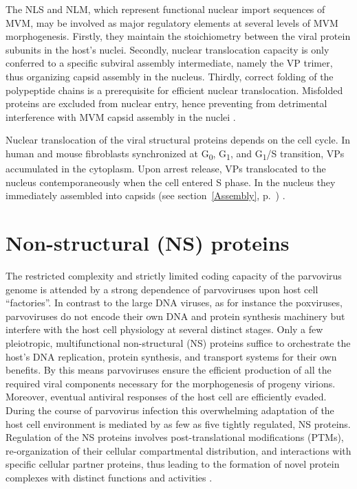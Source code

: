 The NLS and NLM, which represent functional nuclear import sequences of MVM, may be involved as major regulatory elements at several levels of MVM morphogenesis. Firstly, they maintain the stoichiometry between the viral protein subunits in the host's nuclei. Secondly, nuclear translocation capacity is only conferred to a specific subviral assembly intermediate, namely the VP trimer, thus organizing capsid assembly in the nucleus. Thirdly, correct folding of the polypeptide chains is a prerequisite for efficient nuclear translocation. Misfolded proteins are excluded from nuclear entry, hence preventing from detrimental interference with MVM capsid assembly in the nuclei \cite{pmid10729155}.

Nuclear translocation of the viral structural proteins depends on the cell cycle. In human and mouse fibroblasts synchronized at G\textsubscript{0}, G\textsubscript{1}, and G\textsubscript{1}/S transition, VPs accumulated in the cytoplasm. Upon arrest release, VPs translocated to the nucleus contemporaneously when the cell entered S phase. In the nucleus they immediately assembled into capsids (see section~\ref{Assembly}, p.~\pageref{Assembly}) \cite{pmid26067441}.                

 


\section{Non-structural (NS) proteins}
The restricted complexity and strictly limited coding capacity of the parvovirus genome is attended by a strong dependence of parvoviruses upon host cell “factories”. In contrast to the large DNA viruses, as for instance the poxviruses, parvoviruses do not encode their own DNA and protein synthesis machinery but interfere with the host cell physiology at several distinct stages. Only a few pleiotropic, multifunctional non-structural (NS) proteins suffice to orchestrate the host’s DNA replication, protein synthesis, and transport systems for their own benefits. By this means parvoviruses ensure the efficient production of all the required viral components necessary for the morphogenesis of progeny virions. Moreover, eventual antiviral responses of the host cell are efficiently evaded. During the course of parvovirus infection this overwhelming adaptation of the host cell environment is mediated by as few as five tightly regulated, NS proteins. Regulation of the NS proteins involves post-translational modifications (PTMs), re-organization of their cellular compartmental distribution, and interactions with specific cellular partner proteins, thus leading to the formation of novel protein complexes with distinct functions and activities \cite{NS}.        



